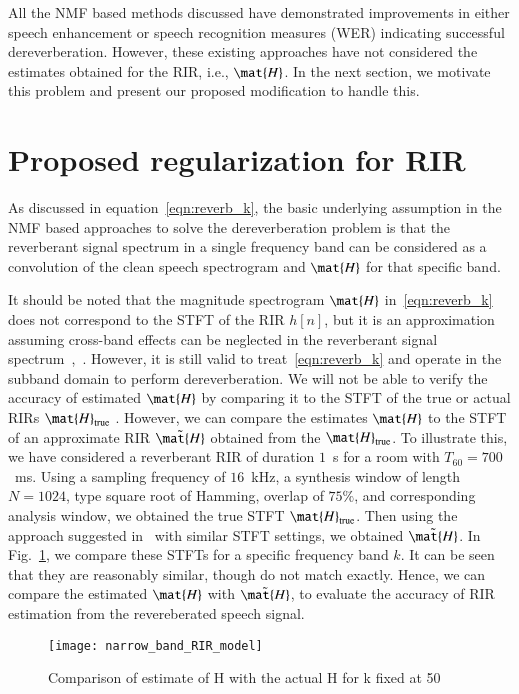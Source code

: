 All the NMF based methods discussed have demonstrated improvements in either
speech enhancement or speech recognition measures (WER) indicating successful
dereverberation. However, these existing approaches have not considered the
estimates obtained for the RIR, i.e., $\mat{H}$. In the next section, we
motivate this problem and present our proposed modification to handle this.

\section{Proposed regularization for RIR}\label{prop_method}
As discussed in equation~\eqref{eqn:reverb_k}, the basic underlying assumption
in the NMF based approaches to solve the dereverberation problem is that the
reverberant signal spectrum in a single frequency band can be considered as a
convolution of the clean speech spectrogram and $\mat{H}$ for that specific
band. 

It should be noted that the magnitude spectrogram $\mat{H}$
in~\eqref{eqn:reverb_k} does not correspond to the STFT of the RIR $h[n]$, but it
is an approximation assuming cross-band effects can be neglected in the
reverberant signal spectrum~\cite{Mohammadiha2016},~\cite{Yekutiel2007}.
However, it is still valid to treat~\eqref{eqn:reverb_k} and operate in the
subband domain to perform dereverberation. We will not be able to verify the
accuracy of estimated $\mat{H}$ by comparing it to the STFT of the true or
actual RIRs $\mat{H}_{\text{true}}$ . However, we can compare the estimates $\mat{H}$ to the STFT of an
approximate RIR $\tilde{\mat{H}}$ obtained from the $\mat{H}_{\text{true}}$. To
illustrate this, we have considered a reverberant RIR of duration $1$~s for a room
with $T_{60} = 700$~ms. Using a sampling frequency of $16$~kHz, a synthesis
window of length $N=1024$, type square root of Hamming, overlap of $75\%$, and corresponding
analysis window, we obtained the true STFT $\mat{H}_{\text{true}}$. Then using the
approach suggested in~\cite{Mohammadiha2016} with similar STFT settings, we
obtained $\tilde{\mat{H}}$. In Fig.~\ref{fig:compare_true_expected}, we compare
these STFTs for a specific frequency band $k$. It can be seen that they are
reasonably similar, though do not match exactly. Hence, we can compare the
estimated $\mat{H}$ with $\tilde{\mat{H}}$, to evaluate the accuracy of RIR
estimation from the revereberated speech signal. 
\begin{figure}
\centering
\texttt{[image: narrow\_band\_RIR\_model]}
\caption{Comparison of estimate of H with the actual H for k fixed at 50}
\label{fig:compare_true_expected}
\end{figure}

